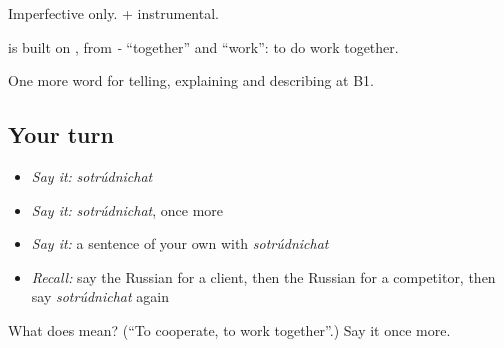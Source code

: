 Imperfective only. \emph{ } + instrumental.

\begin{cousinweb}
\textbf{} is built on \emph{}, from \emph{-} \textquotedblleft{}together\textquotedblright{} and \emph{} \textquotedblleft{}work\textquotedblright{}: to do work together.
\end{cousinweb}

\begin{grammarlens}[title={What you've built}]
One more word for telling, explaining and describing at B1.
\end{grammarlens}

\subsection*{Your turn}
\begin{itemize}
\raggedright
  \item \emph{Say it:} \emph{sotrúdnichat}
  \item \emph{Say it:} \emph{sotrúdnichat}, once more
  \item \emph{Say it:} a sentence of your own with \emph{sotrúdnichat}
  \item \emph{Recall:} say the Russian for a client, then the Russian for a competitor, then say \emph{sotrúdnichat} again
\end{itemize}

\begin{tcolorbox}[breakable,colback=teal!4,colframe=teal!35!black,title={Before you move on}]
What does  mean? (\textquotedblleft{}To cooperate, to work together\textquotedblright{}.) Say it once more.
\end{tcolorbox}
